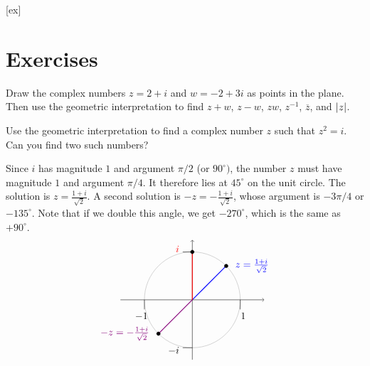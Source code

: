 [ex]
\section*{Exercises}

\begin{enumialphparenastyle}

\begin{ex}
  Draw the complex numbers $z = 2+i$ and $w = -2+3i$ as points in the
  plane. Then use the geometric interpretation to find $z+w$,
  $z-w$, $zw$, $z^{-1}$, $\overline{z}$, and $\left|z\right|$. 
\end{ex}

\begin{ex}
  Use the geometric interpretation to find a complex number $z$ such
  that $z^2 = i$. Can you find two such numbers?
  \begin{sol}
    Since $i$ has magnitude $1$ and argument $\pi/2$ (or
    $90^{\circ})$, the number $z$ must have magnitude $1$ and argument
    $\pi/4$. It therefore lies at $45^{\circ}$ on the unit circle. The
    solution is $z=\frac{1+i}{\sqrt{2}}$. A second solution is
    $-z=-\frac{1+i}{\sqrt{2}}$, whose argument is $-3\pi/4$ or
    $-135^{\circ}$. Note that if we double this angle, we get
    $-270^{\circ}$, which is the same as $+90^{\circ}$.
    \begin{equation*}
      \begin{tikzpicture}[scale=1.7]
        \draw[black!30] (0,0) circle (1);
        \draw[->](-1.5,0) -- (1.5,0);
        \draw[->](0,-1.25) -- (0,1.25);
        \draw(0,-1) -- +(-0.2,0) node[left,yshift=-3pt] {$-i$};
        \draw(0,1) -- +(-0.2,0) node[left,yshift=3pt,red] {$i$};
        \draw(-1,0) -- +(0,-0.2) node[below,xshift=-3pt] {$-1$};
        \draw(1,0) -- +(0,-0.2) node[below,xshift=3pt] {$1$};
        \draw[thick, blue] (0,0) -- (45:1);
        \draw[thick, purple!70!blue] (0,0) -- (225:1);
        \draw[thick, red] (0,0) -- (90:1);
        \draw[fill, black] (45:1) circle [radius=1.06pt] node [right=2mm, blue] {$z = \frac{1+i}{\sqrt{2}}$};
        \draw[fill, black] (225:1) circle [radius=1.06pt] node [left=2mm, purple!70!blue] {$-z = -\frac{1+i}{\sqrt{2}}$};
        \draw[fill, black] (90:1) circle [radius=1.06pt];
      \end{tikzpicture}
    \end{equation*}
  \end{sol}
\end{ex}


\end{enumialphparenastyle}
